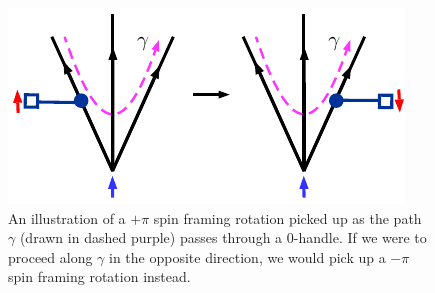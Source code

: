 \documentclass[12pt,a4paper]{article}
\newcommand{\ethan}[1]{{\color{amethyst}\footnotesize{(EL) #1}}}
\begin{document}
\medskip

\begin{figure}
\begin{center}
\includegraphics{spin_rot_through_0handle.pdf}
\caption{ \label{spin_rot_through_0handle} An illustration of a $+\pi$ spin framing rotation picked up as the path $\gamma$ (drawn in dashed purple) passes through a 0-handle. 
If we were to proceed along $\gamma$ in the opposite direction, we would pick up a $-\pi$ spin framing rotation instead. %
  }
\end{center}
\end{figure}
\end{document}
